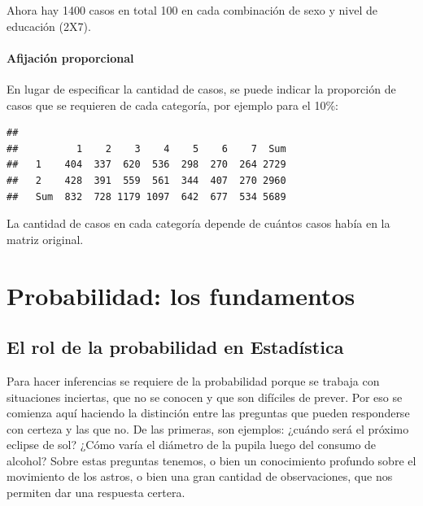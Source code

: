 \documentclass[]{book}
\begin{document}
Ahora hay 1400 casos en total 100 en cada combinación de sexo y nivel de educación (2X7).

\hypertarget{afijaciuxf3n-proporcional}{%
\subsubsection{Afijación proporcional}\label{afijaciuxf3n-proporcional}}

En lugar de especificar la cantidad de casos, se puede indicar la proporción de casos que se requieren de cada categoría, por ejemplo para el 10\%:

\begin{verbatim}
##      
##          1    2    3    4    5    6    7  Sum
##   1    404  337  620  536  298  270  264 2729
##   2    428  391  559  561  344  407  270 2960
##   Sum  832  728 1179 1097  642  677  534 5689
\end{verbatim}

La cantidad de casos en cada categoría depende de cuántos casos había en la matriz original.

\hypertarget{probabilidad-los-fundamentos}{%
\chapter{Probabilidad: los fundamentos}\label{probabilidad-los-fundamentos}}

\hypertarget{el-rol-de-la-probabilidad-en-estaduxedstica}{%
\section{El rol de la probabilidad en Estadística}\label{el-rol-de-la-probabilidad-en-estaduxedstica}}

Para hacer inferencias se requiere de la probabilidad porque se trabaja con situaciones inciertas, que no se conocen y que son difíciles de
prever. Por eso se comienza aquí haciendo la distinción entre las
preguntas que pueden responderse con certeza y las que no. De las
primeras, son ejemplos: ¿cuándo será el próximo eclipse de sol? ¿Cómo varía el diámetro de la pupila luego del consumo de alcohol?
Sobre estas preguntas tenemos, o bien un conocimiento profundo sobre el movimiento de los astros, o bien una gran cantidad de observaciones, que nos permiten dar una respuesta certera.
\end{document}
